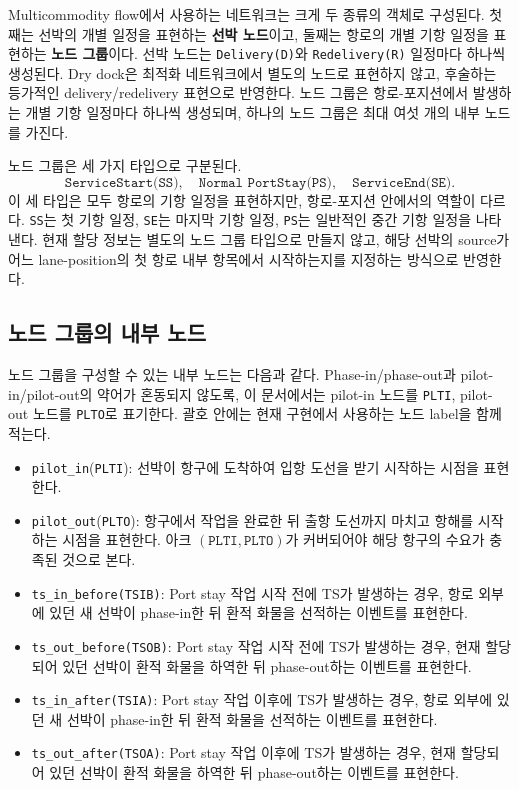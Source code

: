 \documentclass[11pt]{article}
\begin{document}
Multicommodity flow에서 사용하는 네트워크는 크게 두 종류의 객체로 구성된다.
첫째는 선박의 개별 일정을 표현하는 \textbf{선박 노드}이고, 둘째는 항로의
개별 기항 일정을 표현하는 \textbf{노드 그룹}이다. 선박 노드는
\texttt{Delivery(D)}와 \texttt{Redelivery(R)} 일정마다 하나씩 생성된다.
Dry dock은 최적화 네트워크에서 별도의 노드로 표현하지 않고, 후술하는 등가적인
delivery/redelivery 표현으로 반영한다. 노드 그룹은 항로-포지션에서 발생하는
개별 기항 일정마다 하나씩 생성되며, 하나의 노드 그룹은 최대 여섯 개의 내부 노드를
가진다.

노드 그룹은 세 가지 타입으로 구분된다.
\[
  \texttt{ServiceStart(SS)},\quad
  \texttt{Normal\ PortStay(PS)},\quad
  \texttt{ServiceEnd(SE)}.
\]
이 세 타입은 모두 항로의 기항 일정을 표현하지만, 항로-포지션 안에서의 역할이
다르다. \texttt{SS}는 첫 기항 일정, \texttt{SE}는 마지막 기항 일정,
\texttt{PS}는 일반적인 중간 기항 일정을 나타낸다. 현재 할당 정보는 별도의
노드 그룹 타입으로 만들지 않고, 해당 선박의 source가 어느 lane-position의 첫
항로 내부 항목에서 시작하는지를 지정하는 방식으로 반영한다.

\subsection{노드 그룹의 내부 노드}

노드 그룹을 구성할 수 있는 내부 노드는 다음과 같다.
Phase-in/phase-out과 pilot-in/pilot-out의 약어가 혼동되지 않도록, 이 문서에서는
pilot-in 노드를 \texttt{PLTI}, pilot-out 노드를 \texttt{PLTO}로 표기한다.
괄호 안에는 현재 구현에서 사용하는 노드 label을 함께 적는다.

\begin{itemize}[leftmargin=*]
  \item \texttt{pilot\_in}(\texttt{PLTI}): 선박이 항구에 도착하여 입항 도선을 받기 시작하는
  시점을 표현한다.
  \item \texttt{pilot\_out}(\texttt{PLTO}): 항구에서 작업을 완료한 뒤 출항 도선까지 마치고
  항해를 시작하는 시점을 표현한다. 아크
  $(\texttt{PLTI},\texttt{PLTO})$가 커버되어야 해당 항구의 수요가
  충족된 것으로 본다.
  \item \texttt{ts\_in\_before(TSIB)}: Port stay 작업 시작 전에 TS가 발생하는
  경우, 항로 외부에 있던 새 선박이 phase-in한 뒤 환적 화물을 선적하는
  이벤트를 표현한다.
  \item \texttt{ts\_out\_before(TSOB)}: Port stay 작업 시작 전에 TS가 발생하는
  경우, 현재 할당되어 있던 선박이 환적 화물을 하역한 뒤 phase-out하는
  이벤트를 표현한다.
  \item \texttt{ts\_in\_after(TSIA)}: Port stay 작업 이후에 TS가 발생하는
  경우, 항로 외부에 있던 새 선박이 phase-in한 뒤 환적 화물을 선적하는
  이벤트를 표현한다.
  \item \texttt{ts\_out\_after(TSOA)}: Port stay 작업 이후에 TS가 발생하는
  경우, 현재 할당되어 있던 선박이 환적 화물을 하역한 뒤 phase-out하는
  이벤트를 표현한다.
\end{itemize}
\end{document}
